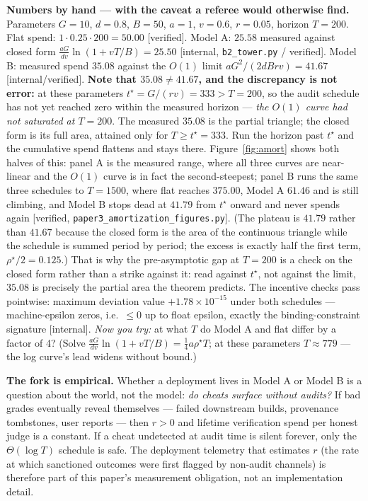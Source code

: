 \documentclass[11pt,a4paper]{article}
\begin{document}
\textbf{Numbers by hand --- with the caveat a referee would otherwise find.} Parameters $G{=}10$, $d{=}0.8$, $B{=}50$, $a{=}1$, $v{=}0.6$, $r{=}0.05$, horizon $T{=}200$. Flat spend: $1 \cdot 0.25 \cdot 200 = 50.00$ [verified]. Model A: $25.58$ measured against closed form $\frac{aG}{dv}\ln(1+vT/B) = 25.50$ [internal, \texttt{b2\_tower.py} / verified]. Model B: measured spend $35.08$ against the $O(1)$ limit $aG^2/(2dBrv) = 41.67$ [internal/verified]. \textbf{Note that $35.08 \neq 41.67$, and the discrepancy is not error:} at these parameters $t^\star = G/(rv) = 333 > T = 200$, so the audit schedule has not yet reached zero within the measured horizon --- \emph{the $O(1)$ curve had not saturated at $T{=}200$}. The measured $35.08$ is the partial triangle; the closed form is its full area, attained only for $T \ge t^\star = 333$. Run the horizon past $t^\star$ and the cumulative spend flattens and stays there. Figure~\ref{fig:amort} shows both halves of this: panel A is the measured range, where all three curves are near-linear and the $O(1)$ curve is in fact the second-steepest; panel B runs the same three schedules to $T{=}1500$, where flat reaches $375.00$, Model A $61.46$ and is still climbing, and Model B stops dead at $41.79$ from $t^\star$ onward and never spends again [verified, \texttt{paper3\_amortization\_figures.py}]. (The plateau is $41.79$ rather than $41.67$ because the closed form is the area of the continuous triangle while the schedule is summed period by period; the excess is exactly half the first term, $\rho^\star/2 = 0.125$.) That is why the pre-asymptotic gap at $T{=}200$ is a check on the closed form rather than a strike against it: read against $t^\star$, not against the limit, $35.08$ is precisely the partial area the theorem predicts. The incentive checks pass pointwise: maximum deviation value $+1.78\times 10^{-15}$ under both schedules --- machine-epsilon zeros, i.e.\ $\le 0$ up to float epsilon, exactly the binding-constraint signature [internal]. \emph{Now you try:} at what $T$ do Model A and flat differ by a factor of 4? (Solve $\frac{aG}{dv}\ln(1+vT/B) = \tfrac14 a\rho^\star T$; at these parameters $T \approx 779$ --- the log curve's lead widens without bound.)



\textbf{The fork is empirical.} Whether a deployment lives in Model A or Model B is a question about the world, not the model: \emph{do cheats surface without audits?} If bad grades eventually reveal themselves --- failed downstream builds, provenance tombstones, user reports --- then $r > 0$ and lifetime verification spend per honest judge is a constant. If a cheat undetected at audit time is silent forever, only the $\Theta(\log T)$ schedule is safe. The deployment telemetry that estimates $r$ (the rate at which sanctioned outcomes were first flagged by non-audit channels) is therefore part of this paper's measurement obligation, not an implementation detail.
\end{document}
